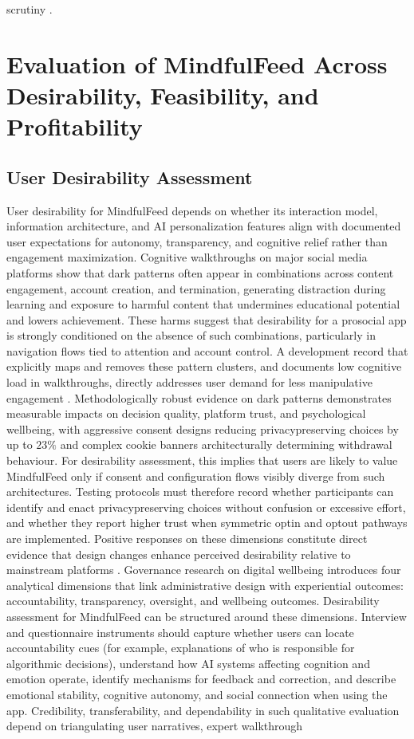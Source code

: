 \documentclass{article}
\begin{document}
scrutiny \parencites[2]{2832310}.

\section{Evaluation of MindfulFeed Across Desirability, Feasibility, and Profitability}

\subsection{User Desirability Assessment}
\label{sec:user_desirability_assessment} User desirability for MindfulFeed depends on whether its interaction model, information architecture, and AI personalization features align with documented user expectations for autonomy, transparency, and cognitive relief rather than engagement maximization. Cognitive walkthroughs on major social media platforms show that dark patterns often appear in combinations across content engagement, account creation, and termination, generating distraction during learning and exposure to harmful content that undermines educational potential and lowers achievement. These harms suggest that desirability for a pro\-social app is strongly conditioned on the absence of such combinations, particularly in navigation flows tied to attention and account control. A development record that explicitly maps and removes these pattern clusters, and documents low cognitive load in walkthroughs, directly addresses user demand for less manipulative engagement \parencites[3]{4692551}. Methodologically robust evidence on dark patterns demonstrates measurable impacts on decision quality, platform trust, and psychological wellbeing, with aggressive consent designs reducing privacy\-preserving choices by up to $23\%$ and complex cookie banners architecturally determining withdrawal behaviour. For desirability assessment, this implies that users are likely to value MindfulFeed only if consent and configuration flows visibly diverge from such architectures. Testing protocols must therefore record whether participants can identify and enact privacy\-preserving choices without confusion or excessive effort, and whether they report higher trust when symmetric opt\-in and opt\-out pathways are implemented. Positive responses on these dimensions constitute direct evidence that design changes enhance perceived desirability relative to mainstream platforms \parencites[2]{4807303}. Governance research on digital well\-being introduces four analytical dimensions that link administrative design with experiential outcomes: accountability, transparency, oversight, and well\-being outcomes. Desirability assessment for MindfulFeed can be structured around these dimensions. Interview and questionnaire instruments should capture whether users can locate accountability cues (for example, explanations of who is responsible for algorithmic decisions), understand how AI systems affecting cognition and emotion operate, identify mechanisms for feedback and correction, and describe emotional stability, cognitive autonomy, and social connection when using the app. Credibility, transferability, and dependability in such qualitative evaluation depend on triangulating user narratives, expert walkthrough 
\end{document}

